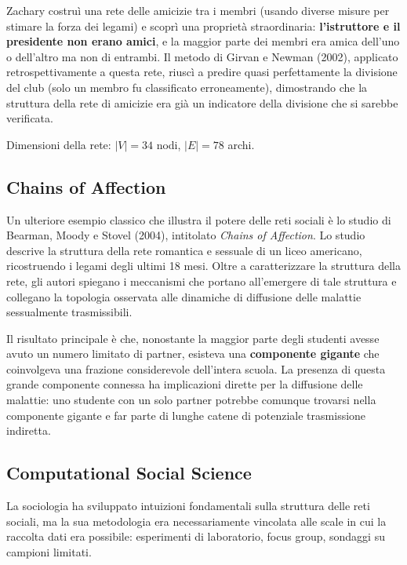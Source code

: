 \documentclass[12pt,a4paper]{article}
\begin{document}
Zachary costruì una rete delle amicizie tra i membri (usando diverse misure per stimare
la forza dei legami) e scoprì una proprietà straordinaria: \textbf{l'istruttore e il
presidente non erano amici}, e la maggior parte dei membri era amica dell'uno o dell'altro
ma non di entrambi. Il metodo di Girvan e Newman (2002), applicato retrospettivamente a
questa rete, riuscì a predire quasi perfettamente la divisione del club (solo un membro
fu classificato erroneamente), dimostrando che la struttura della rete di amicizie era
già un indicatore della divisione che si sarebbe verificata.

\medskip
Dimensioni della rete: $|V| = 34$ nodi, $|E| = 78$ archi.

\subsection{Chains of Affection}

Un ulteriore esempio classico che illustra il potere delle reti sociali è lo studio di
Bearman, Moody e Stovel (2004), intitolato \textit{Chains of Affection}.
Lo studio descrive la struttura della rete romantica e sessuale di un liceo americano,
ricostruendo i legami degli ultimi 18 mesi. Oltre a caratterizzare la struttura della
rete, gli autori spiegano i meccanismi che portano all'emergere di tale struttura e
collegano la topologia osservata alle dinamiche di diffusione delle malattie sessualmente
trasmissibili.

Il risultato principale è che, nonostante la maggior parte degli studenti avesse avuto
un numero limitato di partner, esisteva una \textbf{componente gigante} che coinvolgeva
una frazione considerevole dell'intera scuola. La presenza di questa grande componente
connessa ha implicazioni dirette per la diffusione delle malattie: uno studente con un
solo partner potrebbe comunque trovarsi nella componente gigante e far parte di lunghe
catene di potenziale trasmissione indiretta.

\subsection{Computational Social Science}

La sociologia ha sviluppato intuizioni fondamentali sulla struttura delle reti sociali, ma
la sua metodologia era necessariamente vincolata alle scale in cui la raccolta dati era
possibile: esperimenti di laboratorio, focus group, sondaggi su campioni limitati.
\end{document}
